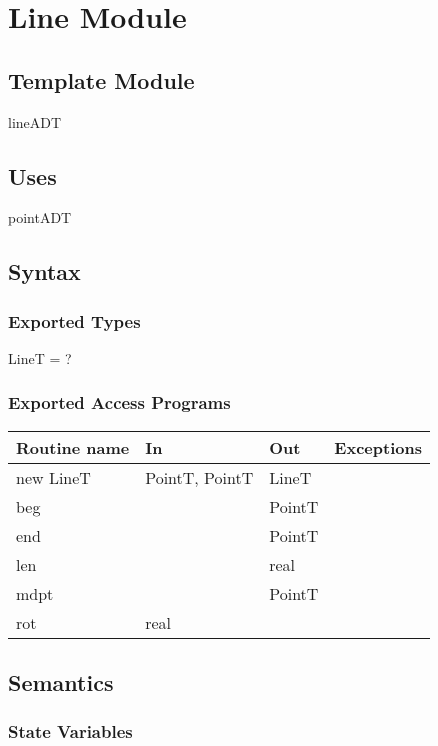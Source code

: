 \documentclass[12pt,fleqn]{article}
\begin{document}
\newpage

\section* {Line Module}

\subsection* {Template Module}

lineADT

\subsection* {Uses}

pointADT

\subsection* {Syntax}

\subsubsection* {Exported Types}

LineT = ?

\subsubsection* {Exported Access Programs}

\begin{tabular}{| l | l | l | l |}
\hline
\textbf{Routine name} & \textbf{In} & \textbf{Out} & \textbf{Exceptions}\\
\hline
new LineT & PointT, PointT & LineT & ~\\
\hline
beg & ~ & PointT & ~\\
\hline
end & ~ & PointT & ~\\
\hline 
len & ~ & real & ~\\
\hline
mdpt & ~ & PointT & ~\\
\hline
rot & real & ~ & ~\\
\hline
\end{tabular}

\subsection* {Semantics}

\subsubsection* {State Variables}
\end{document}
